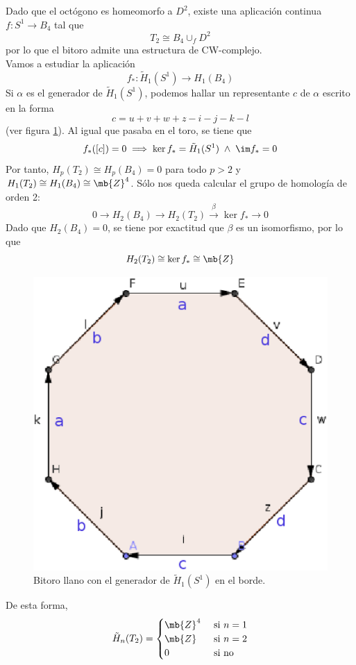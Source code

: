 Dado que el octógono es homeomorfo a $D^2$, existe una aplicación continua $f: S^1 \longrightarrow B_4$ tal que \[T_2 \cong B_4 \cup_f D^2\] por lo que el bitoro admite una estructura de CW-complejo.
\\

Vamos a estudiar la aplicación $$f_*: \tilde{H}_1(S^1) \longrightarrow H_1(B_4)$$ Si $\alpha$ es el generador de $\tilde{H}_1(S^1)$, podemos hallar un representante $c$ de $\alpha$ escrito en la forma $$c=u+v+w+z-i-j-k-l$$ (ver figura \ref{BitoroCW}). Al igual que pasaba en el toro, se tiene que $$f_*([c])=0 \implies \ker f_*=\tilde{H}_1(S^1)\; \land\; \im f_*=0$$ Por tanto, $H_p(T_2)\cong H_p(B_4)=0$ para todo $p > 2$ y $H_1(T_2) \cong H_1(B_4)\cong \mb{Z}^4$. Sólo nos queda calcular el grupo de homología de orden 2: \[0 \longrightarrow H_2(B_4) \longrightarrow H_2(T_2) \xrightarrow{\beta} \ker f_* \longrightarrow 0\] Dado que $H_2(B_4)=0$, se tiene por exactitud que $\beta$ es un isomorfismo, por lo que \[H_2(T_2) \cong \ker f_* \cong \mb{Z}\] 

\begin{figure}[h]
\centering
\includegraphics[scale=0.4]{Figures/BitoroCW}
\caption{\label{BitoroCW} Bitoro llano con el generador de $\tilde{H}_1(S^1)$ en el borde.}
\end{figure}

De esta forma, \[\tilde{H}_n(T_2)=
\begin{cases}
\mb{Z}^4	&\mbox{ si }n =1\\
\mb{Z}		&\mbox{ si }n =2\\
0     &\mbox{ si no}
\end{cases}\]

